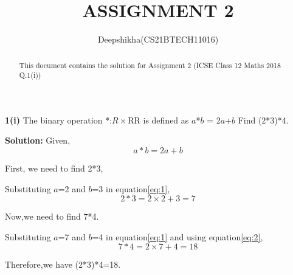 \documentclass[journal, 12pt, twocolumn]{IEEEtran}
\begin{document}
\title{ASSIGNMENT 2}
\author{Deepshikha(CS21BTECH11016)}
\maketitle

\begin{abstract}
This document contains the solution for Assignment 2 (ICSE Class 12 Maths 2018 Q.1(i))
\end{abstract}

\textbf{1(i)}
The binary operation *:$R\times$R\textrightarrow R is defined as $a$*$b$ = 2$a$+$b$ Find (2*3)*4.


\textbf{Solution:}
Given,
\begin{equation}
     a*b=2a+b\label{eq:1}
\end{equation}

First, we need to find 2*3,


Substituting $a$=2 and $b$=3 in equation\eqref{eq:1},
\begin{equation}
    2*3=2\times2+3=7\label{eq:2}
\end{equation}

Now,we need to find 7*4.


Substituting $a$=7 and $b$=4 in equation\eqref{eq:1} and using equation\eqref{eq:2},
\begin{equation}
    7*4=2\times7+4=18\label{eq:3}
\end{equation}

Therefore,we have (2*3)*4=18.
\end{document}
